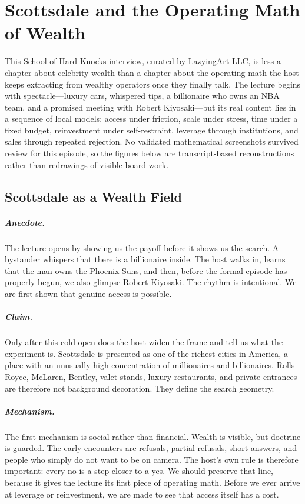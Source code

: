 \chapter{Scottsdale and the Operating Math of Wealth}

This School of Hard Knocks interview, curated by LazyingArt LLC, is less a chapter about celebrity wealth than a chapter about the operating math the host keeps extracting from wealthy operators once they finally talk. The lecture begins with spectacle---luxury cars, whispered tips, a billionaire who owns an NBA team, and a promised meeting with Robert Kiyosaki---but its real content lies in a sequence of local models: access under friction, scale under stress, time under a fixed budget, reinvestment under self-restraint, leverage through institutions, and sales through repeated rejection. No validated mathematical screenshots survived review for this episode, so the figures below are transcript-based reconstructions rather than redrawings of visible board work.

\section{Scottsdale as a Wealth Field}

\paragraph{Anecdote.} The lecture opens by showing us the payoff before it shows us the search. A bystander whispers that there is a billionaire inside. The host walks in, learns that the man owns the Phoenix Suns, and then, before the formal episode has properly begun, we also glimpse Robert Kiyosaki. The rhythm is intentional. We are first shown that genuine access is possible.

\paragraph{Claim.} Only after this cold open does the host widen the frame and tell us what the experiment is. Scottsdale is presented as one of the richest cities in America, a place with an unusually high concentration of millionaires and billionaires. Rolls Royce, McLaren, Bentley, valet stands, luxury restaurants, and private entrances are therefore not background decoration. They define the search geometry.

\paragraph{Mechanism.} The first mechanism is social rather than financial. Wealth is visible, but doctrine is guarded. The early encounters are refusals, partial refusals, short answers, and people who simply do not want to be on camera. The host's own rule is therefore important: every no is a step closer to a yes. We should preserve that line, because it gives the lecture its first piece of operating math. Before we ever arrive at leverage or reinvestment, we are made to see that access itself has a cost.

